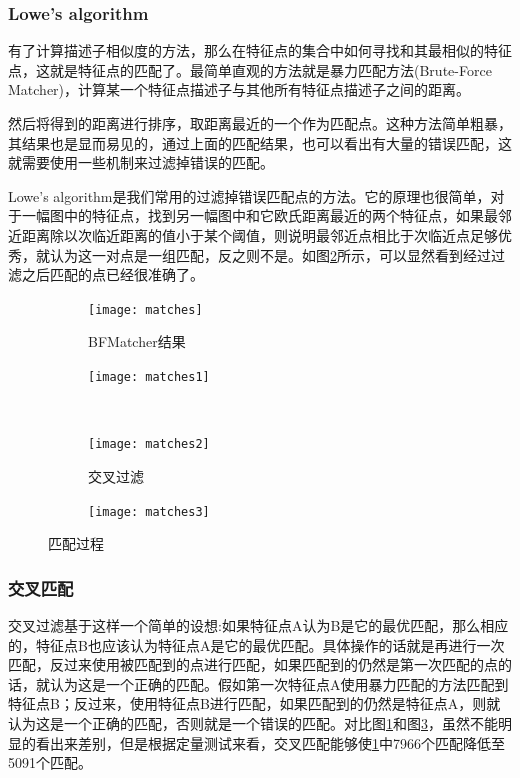 \subsubsection{Lowe’s algorithm}
有了计算描述子相似度的方法，那么在特征点的集合中如何寻找和其最相似的特征点，这就是特征点的匹配了。最简单直观的方法就是暴力匹配方法(Brute-Force Matcher)，计算某一个特征点描述子与其他所有特征点描述子之间的距离。\par
然后将得到的距离进行排序，取距离最近的一个作为匹配点。这种方法简单粗暴，其结果也是显而易见的，通过上面的匹配结果，也可以看出有大量的错误匹配，这就需要使用一些机制来过滤掉错误的匹配。\par
Lowe's algorithm\cite{muja2009fast}是我们常用的过滤掉错误匹配点的方法。它的原理也很简单，对于一幅图中的特征点，找到另一幅图中和它欧氏距离最近的两个特征点，如果最邻近距离除以次临近距离的值小于某个阈值，则说明最邻近点相比于次临近点足够优秀，就认为这一对点是一组匹配，反之则不是。如图\ref{lowe's filter}所示，可以显然看到经过过滤之后匹配的点已经很准确了。
\begin{figure}[H]
	\centering
	\begin{subfigure}[ht]{0.4\textwidth}
		\centering
		\texttt{[image: matches]}
		\caption{BFMatcher结果}
		\label{no filter}
	\end{subfigure}
	\quad
	\begin{subfigure}[ht]{0.4\textwidth}
		\centering
		\texttt{[image: matches1]}
		\label{lowe's filter}
	\end{subfigure}\\
	\begin{subfigure}[ht]{0.4\textwidth}
		\centering
		\texttt{[image: matches2]}
		\caption{交叉过滤}
		\label{crosscheck filter}
	\end{subfigure}
	\quad
	\begin{subfigure}[ht]{0.4\textwidth}
		\centering
		\texttt{[image: matches3]}
		\label{RANSAC filter}
	\end{subfigure}
	\caption{匹配过程}
	\label{filters}
\end{figure}
\subsubsection{交叉匹配}
交叉过滤基于这样一个简单的设想:如果特征点A认为B是它的最优匹配，那么相应的，特征点B也应该认为特征点A是它的最优匹配。具体操作的话就是再进行一次匹配，反过来使用被匹配到的点进行匹配，如果匹配到的仍然是第一次匹配的点的话，就认为这是一个正确的匹配。假如第一次特征点A使用暴力匹配的方法匹配到特征点B；反过来，使用特征点B进行匹配，如果匹配到的仍然是特征点A，则就认为这是一个正确的匹配，否则就是一个错误的匹配。对比图\ref{no filter}和图\ref{crosscheck filter}，虽然不能明显的看出来差别，但是根据定量测试来看，交叉匹配能够使\ref{no filter}中7966个匹配降低至5091个匹配。
